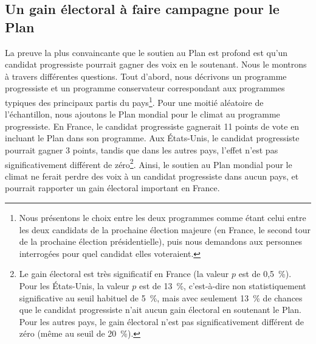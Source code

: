 \documentclass[a5paper,french,openany]{memoir}
\begin{document}
\subsection{Un gain électoral à faire campagne pour le Plan}
La preuve la plus convaincante que le soutien au Plan est profond est qu'un candidat progressiste pourrait gagner des voix en le soutenant. Nous le montrons à travers différentes questions. Tout d'abord, nous décrivons un programme progressiste et un programme conservateur correspondant aux programmes typiques des principaux partis du pays\footnote{Nous présentons le choix entre les deux programmes comme étant celui entre les deux candidats de la prochaine élection majeure (en France, le second tour de la prochaine élection présidentielle), puis nous demandons aux personnes interrogées pour quel candidat elles voteraient.}. Pour une moitié aléatoire de l'échantillon, nous ajoutons le Plan mondial pour le climat au programme progressiste. En France, le candidat progressiste gagnerait 11 points de vote en incluant le Plan dans son programme. Aux États-Unis, le candidat progressiste pourrait gagner 3 points, tandis que dans les autres pays, l'effet n'est pas significativement différent de zéro\footnote{Le gain électoral est très significatif en France (la valeur $p$ est de 0,5~\%). Pour les États-Unis, la valeur $p$ est de 13~\%, c'est-à-dire non statistiquement significative au seuil habituel de 5~\%, mais avec seulement 13~\% de chances que le candidat progressiste n'ait aucun gain électoral en soutenant le Plan. Pour les autres pays, le gain électoral n'est pas significativement différent de zéro (même au seuil de 20~\%).}. 
%
Ainsi, le soutien au Plan mondial pour le climat ne ferait perdre des voix à un candidat progressiste dans aucun pays, et pourrait rapporter un gain électoral important en France. 
\end{document}
